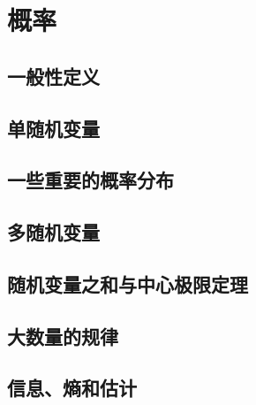 \chapter{概率}

\section{一般性定义}
\section{单随机变量}
\section{一些重要的概率分布}
\section{多随机变量}
\section{随机变量之和与中心极限定理}
\section{大数量的规律}
\section{信息、熵和估计}
